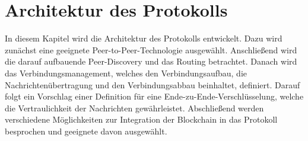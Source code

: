 \chapter{Architektur des Protokolls}
\label{chap:entwurf_und_architektur}

In diesem Kapitel wird die Architektur des Protokolls entwickelt. Dazu wird zunächst eine geeignete Peer-to-Peer-Technologie ausgewählt. Anschließend wird die darauf aufbauende Peer-Discovery und das Routing betrachtet. Danach wird das Verbindungsmanagement, welches den Verbindungsaufbau, die Nachrichtenübertragung und den Verbindungsabbau beinhaltet, definiert. Darauf folgt ein Vorschlag einer Definition für eine Ende-zu-Ende-Verschlüsselung, welche die Vertraulichkeit der Nachrichten gewährleistet. Abschließend werden verschiedene Möglichkeiten zur Integration der Blockchain in das Protokoll besprochen und geeignete davon ausgewählt.












